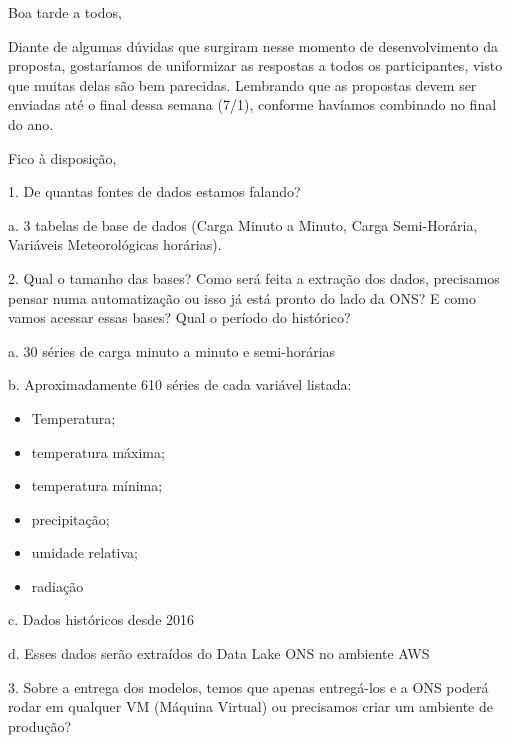 \documentclass[a4paper, 12pt]{report}
\begin{document}
\vspace{.5cm}

Boa tarde a todos,

 

Diante de algumas dúvidas que surgiram nesse momento de desenvolvimento da proposta, gostaríamos de uniformizar as respostas a todos os participantes, visto que muitas delas são bem parecidas. Lembrando que as propostas devem ser enviadas até o final dessa semana (7/1), conforme havíamos combinado no final do ano.

\vspace{.3cm} 

Fico à disposição,

1. De quantas fontes de dados estamos falando?
\vspace{.2cm}

a. 3 tabelas de base de dados (Carga Minuto a Minuto, Carga Semi-Horária, Variáveis Meteorológicas horárias).
\vspace{.2cm}

2. Qual o tamanho das bases? Como será feita a extração dos dados, precisamos pensar numa automatização ou isso já está pronto do lado da ONS? E como vamos acessar essas bases? Qual o período do histórico?
\vspace{.2cm}

a. 30 séries de carga minuto a minuto e semi-horárias
\vspace{.2cm}

b. Aproximadamente 610 séries de cada variável listada:

\begin{itemize}
    \item Temperatura;
    \item temperatura máxima;
    \item temperatura mínima;
    \item precipitação;
    \item umidade relativa;
    \item radiação
    
\end{itemize}
\vspace{.2cm}



c. Dados históricos desde 2016
\vspace{.2cm}

d. Esses dados serão extraídos do Data Lake ONS no ambiente AWS
\vspace{.2cm}

3. Sobre a entrega dos modelos, temos que apenas entregá-los e a ONS poderá rodar em qualquer VM (Máquina Virtual) ou precisamos criar um ambiente de produção?
\vspace{.2cm}
\end{document}
